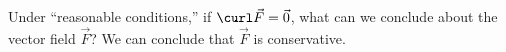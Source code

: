 {Under ``reasonable conditions,'' if $\curl \vec F = \vec 0$, what can we conclude about the vector field $\vec F$?
}
{We can conclude that $\vec F$ is conservative.
}
